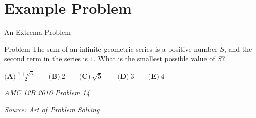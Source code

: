 \section{Example Problem}
\begin{namedframe}{An Extrema Problem}
	\begin{exampleblock}{Problem}
		The sum of an infinite geometric series is a positive number $S$, and the second term in the series is $1$. What is the smallest possible value of $S?$

		\phantom{ }

		$\textbf{(A)}\ \frac{1+\sqrt{5}}{2} \qquad \textbf{(B)}\ 2 \qquad \textbf{(C)}\ \sqrt{5} \qquad \textbf{(D)}\ 3 \qquad \textbf{(E)}\ 4$

		\phantom{ }

		\textit{AMC 12B 2016 Problem 14}

		\textit{Source: Art of Problem Solving}
	\end{exampleblock}
\end{namedframe}

